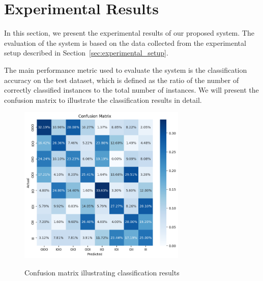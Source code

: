 
\section{Experimental Results}
\label{sec:experimental_results}

In this section, we present the experimental results of our proposed system. The evaluation of the system is based on the data collected from the experimental setup described in Section~\ref{sec:experimental_setup}. 

The main performance metric used to evaluate the system is the classification accuracy on the test dataset, which is defined as the ratio of the number of correctly classified instances to the total number of instances. We will present the confusion matrix to illustrate the classification results in detail.


\begin{figure}[H]
    \begin{center}
        \includegraphics[width=8cm]{Figures/confusion_matrix.png}\vspace{0mm}
        \caption{Confusion matrix illustrating classification results}\vspace{0mm}
        \label{fig:confusion_matrix}
    \end{center}
\end{figure}

